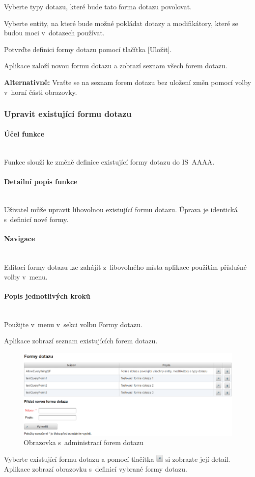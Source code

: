 \documentclass[thesis=M,czech]{FITthesis}[2019/12/23]
\newcommand{\lbparagraph}[1]{\paragraph{#1}\mbox{}\\} %
\newenvironment{reusefigure}[2][htbp]
  {\addtocounter{figure}{-1}%
   \renewcommand{\theHfigure}{dupe-fig}%
   \renewcommand{\thefigure}{\ref{#2}}%
   \renewcommand{\addcontentsline}[3]{}%
   \begin{figure}[#1]}
  {\end{figure}} %
\begin{document}
Vyberte typy dotazu, které bude tato forma dotazu povolovat.

Vyberte entity, na které bude možné pokládat dotazy a modifikátory, které se budou moci v~dotazech používat.

Potvrďte definici formy dotazu pomocí tlačítka [Uložit].

Aplikace založí novou formu dotazu a zobrazí seznam všech forem dotazu.

\textbf{Alternativně:} Vraťte se na seznam forem dotazu bez uložení změn pomocí volby  v~horní části obrazovky.

\newpage
\subsubsection{Upravit existující formu dotazu}
\lbparagraph{Účel funkce}
Funkce slouží ke změně definice existující formy dotazu do IS~AAAA.

\lbparagraph{Detailní popis funkce}
Uživatel může upravit libovolnou existující formu dotazu. Úprava je identická s~definicí nové formy.

\lbparagraph{Navigace}
Editaci formy dotazu lze zahájit z~libovolného místa aplikace použitím příslušné volby v~menu.

\lbparagraph{Popis jednotlivých kroků}
Použijte v~menu v~sekci  volbu Formy dotazu.

Aplikace zobrazí seznam existujících forem dotazu.

\begin{reusefigure}[H]{fig:Obrazovka s~administrací forem dotazu}
  \includegraphics[width=\textwidth]{res/guide/QueryForms.png}
  \caption{Obrazovka s~administrací forem dotazu}
\end{reusefigure}

Vyberte existující formu dotazu a pomocí tlačítka \includegraphics[height=1em]{res/guide/SearchIcon.png} si zobrazte její detail.
Aplikace zobrazí obrazovku s~definicí vybrané formy dotazu.
\end{document}
